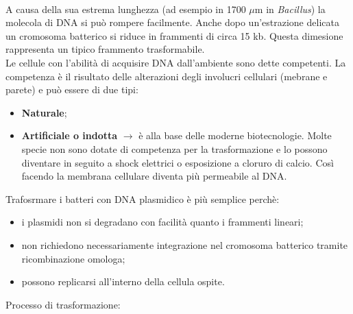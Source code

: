 \\A causa della sua estrema lunghezza (ad esempio in 1700 $\mu$m in \textit{Bacillus}) la molecola di DNA si può rompere facilmente. Anche dopo un'estrazione delicata un cromosoma batterico si riduce in frammenti di circa 15 kb. Questa dimesione rappresenta un tipico frammento trasformabile. 
\\Le cellule con l'abilità di acquisire DNA dall'ambiente sono dette competenti. La competenza è il risultato delle alterazioni degli involucri cellulari (mebrane e parete) e può essere di due tipi:
\begin{itemize}
    \item \textbf{Naturale}; 
    \item \textbf{Artificiale o indotta} $\xrightarrow{}$ è alla base delle moderne biotecnologie. Molte specie non sono dotate di competenza per la trasformazione e lo possono diventare in seguito a shock elettrici o esposizione a cloruro di calcio. Così facendo la membrana cellulare diventa più permeabile al DNA. 
\end{itemize}
Trafosrmare i batteri con DNA plasmidico è più semplice perchè:
\begin{itemize}
    \item i plasmidi non si degradano con facilità quanto i frammenti lineari;
    \item non richiedono necessariamente integrazione nel cromosoma batterico tramite ricombinazione omologa; 
    \item possono replicarsi all'interno della cellula ospite.
\end{itemize}
Processo di trasformazione:
